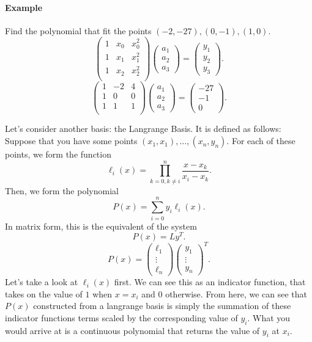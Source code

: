 \documentclass[5pt, a4paper]{article}
\begin{document}
\paragraph{Example}
Find the polynomial that fit the points $(-2,-27),(0,-1),(1,0)$.
\[
\begin{pmatrix} 
    1 & x_0 & x_0^2 \\
    1 & x_1 & x_1^2 \\
    1 & x_2 & x_2^2 \\
\end{pmatrix} 
\begin{pmatrix} a_1 \\ a_2 \\ a_3 \end{pmatrix} 
=\begin{pmatrix} y_1 \\ y_2 \\ y_3 \end{pmatrix} 
.\] 
\[
\begin{pmatrix} 
    1 & -2 & 4  \\
    1 & 0 & 0 \\
    1 & 1 & 1 \\
\end{pmatrix} 
\begin{pmatrix} a_1 \\ a_2 \\ a_3 \end{pmatrix} 
=
\begin{pmatrix} -27 \\ -1 \\ 0 \end{pmatrix} 
.\] 

Let's consider another basis: the Langrange Basis. It is defined as follows:
Suppose that you have some points $(x_1,x_1), \ldots, (x_{n}, y_{n})$. For each
of these points, we form the function \[
\ell_i (x) = \prod_{k = 0, k \neq i}^{n} \frac{x - x_k}{x_{i} - x_k}  
.\] 
Then, we form the polynomial \[
P(x) = \sum_{i = 0}^{n} y_{i} \ell_i (x)
.\] 
In matrix form, this is the equivalent of the system \[
    P(x) = L y^{T}
.\] 
\[
P(x) = \begin{pmatrix} \ell_1 \\ \vdots \\ \ell_n \end{pmatrix} 
\begin{pmatrix} y_1 \\ \vdots \\ y_n \end{pmatrix}^{T}
.\] 
Let's take a look at $\ell_i (x)$ first. We can see this as an indicator
function, that takes on the value of $1$ when $x = x_i$ and $0$ otherwise. From
here, we can see that $P(x)$  constructed from a langrange basis is simply the
summation of these indicator functions terms scaled by the corresponding value
of $y_i$. What you would arrive at is a continuous polynomial that returns the
value of $y_i$ at $x_i$.
\end{document}
